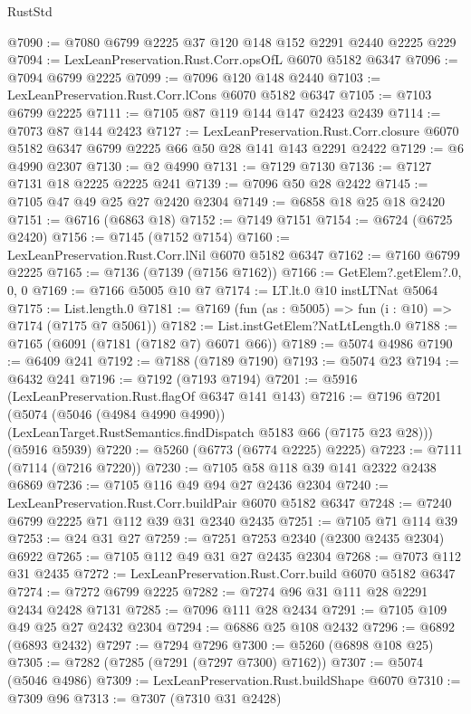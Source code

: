 \begin{lexlean}{RustStd}
\begin{coremodule}
@7090 := @7080 @6799 @2225 @37 @120 @148 @152 @2291 @2440 @2225 @229
@7094 := LexLeanPreservation.Rust.Corr.opsOfL @6070 @5182 @6347
@7096 := @7094 @6799 @2225
@7099 := @7096 @120 @148 @2440
@7103 := LexLeanPreservation.Rust.Corr.lCons @6070 @5182 @6347
@7105 := @7103 @6799 @2225
@7111 := @7105 @87 @119 @144 @147 @2423 @2439
@7114 := @7073 @87 @144 @2423
@7127 := LexLeanPreservation.Rust.Corr.closure
    @6070
    @5182
    @6347
    @6799
    @2225
    @66
    @50
    @28
    @141
    @143
    @2291
    @2422
@7129 := @6 @4990 @2307
@7130 := @2 @4990
@7131 := @7129 @7130
@7136 := @7127 @7131 @18 @2225 @2225 @241
@7139 := @7096 @50 @28 @2422
@7145 := @7105 @47 @49 @25 @27 @2420 @2304
@7149 := @6858 @18 @25 @18 @2420
@7151 := @6716 (@6863 @18)
@7152 := @7149 @7151
@7154 := @6724 (@6725 @2420)
@7156 := @7145 (@7152 @7154)
@7160 := LexLeanPreservation.Rust.Corr.lNil @6070 @5182 @6347
@7162 := @7160 @6799 @2225
@7165 := @7136 (@7139 (@7156 @7162))
@7166 := GetElem?.getElem?.{0, 0, 0}
@7169 := @7166 @5005 @10 @7
@7174 := LT.lt.{0} @10 instLTNat @5064
@7175 := List.length.{0}
@7181 := @7169 (fun (as : @5005) => fun (i : @10) => @7174 (@7175 @7 @5061))
@7182 := List.instGetElem?NatLtLength.{0}
@7188 := @7165 (@6091 (@7181 (@7182 @7) @6071 @66))
@7189 := @5074 @4986
@7190 := @6409 @241
@7192 := @7188 (@7189 @7190)
@7193 := @5074 @23
@7194 := @6432 @241
@7196 := @7192 (@7193 @7194)
@7201 := @5916 (LexLeanPreservation.Rust.flagOf @6347 @141 @143)
@7216 := @7196
    @7201
    (@5074
      (@5046 (@4984 @4990 @4990))
      (LexLeanTarget.RustSemantics.findDispatch @5183 @66 (@7175 @23 @28)))
    (@5916 @5939)
@7220 := @5260 (@6773 (@6774 @2225) @2225)
@7223 := @7111 (@7114 (@7216 @7220))
@7230 := @7105 @58 @118 @39 @141 @2322 @2438 @6869
@7236 := @7105 @116 @49 @94 @27 @2436 @2304
@7240 := LexLeanPreservation.Rust.Corr.buildPair @6070 @5182 @6347
@7248 := @7240 @6799 @2225 @71 @112 @39 @31 @2340 @2435
@7251 := @7105 @71 @114 @39
@7253 := @24 @31 @27
@7259 := @7251 @7253 @2340 (@2300 @2435 @2304) @6922
@7265 := @7105 @112 @49 @31 @27 @2435 @2304
@7268 := @7073 @112 @31 @2435
@7272 := LexLeanPreservation.Rust.Corr.build @6070 @5182 @6347
@7274 := @7272 @6799 @2225
@7282 := @7274 @96 @31 @111 @28 @2291 @2434 @2428 @7131
@7285 := @7096 @111 @28 @2434
@7291 := @7105 @109 @49 @25 @27 @2432 @2304
@7294 := @6886 @25 @108 @2432
@7296 := @6892 (@6893 @2432)
@7297 := @7294 @7296
@7300 := @5260 (@6898 @108 @25)
@7305 := @7282 (@7285 (@7291 (@7297 @7300) @7162))
@7307 := @5074 (@5046 @4986)
@7309 := LexLeanPreservation.Rust.buildShape @6070
@7310 := @7309 @96
@7313 := @7307 (@7310 @31 @2428)

\end{coremodule}
\end{lexlean}
